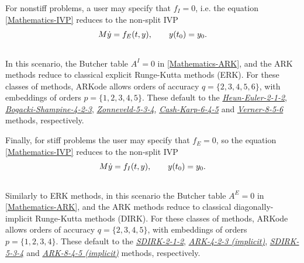 \documentclass[letterpaper,10pt,english]{sphinxmanual}
\begin{document}
For nonstiff problems, a user may specify that $f_I = 0$,
i.e. the equation \eqref{Mathematics-IVP} reduces to the non-split IVP
\label{Mathematics:equation-IVP_explicit}\begin{gather}
\begin{split}M\dot{y} = f_E(t,y), \qquad y(t_0) = y_0.\end{split}\label{Mathematics-IVP_explicit}\\\begin{split}\end{split}\notag
\end{gather}
In this scenario, the Butcher table $A^I=0$ in \eqref{Mathematics-ARK}, and
the ARK methods reduce to classical explicit Runge-Kutta
methods (ERK).  For these classes of methods, ARKode allows orders of
accuracy $q = \{2,3,4,5,6\}$, with embeddings of orders $p
= \{1,2,3,4,5\}$.  These default to the {\hyperref[Butcher:butcher-heun-euler]{\emph{Heun-Euler-2-1-2}}},
{\hyperref[Butcher:butcher-bogacki-shampine]{\emph{Bogacki-Shampine-4-2-3}}}, {\hyperref[Butcher:butcher-zonneveld]{\emph{Zonneveld-5-3-4}}},
{\hyperref[Butcher:butcher-cash-karp]{\emph{Cash-Karp-6-4-5}}} and {\hyperref[Butcher:butcher-verner-6-5]{\emph{Verner-8-5-6}}} methods,
respectively.

Finally, for stiff problems the user may specify that $f_E = 0$,
so the equation \eqref{Mathematics-IVP} reduces to the non-split IVP
\label{Mathematics:equation-IVP_implicit}\begin{gather}
\begin{split}M\dot{y} = f_I(t,y), \qquad y(t_0) = y_0.\end{split}\label{Mathematics-IVP_implicit}\\\begin{split}\end{split}\notag
\end{gather}
Similarly to ERK methods, in this scenario the Butcher table
$A^E=0$ in \eqref{Mathematics-ARK}, and the ARK methods reduce to classical
diagonally-implicit Runge-Kutta methods (DIRK).  For these
classes of methods, ARKode allows orders of accuracy $q =
\{2,3,4,5\}$, with embeddings of orders $p = \{1,2,3,4\}$.
These default to the {\hyperref[Butcher:butcher-sdirk-2-1]{\emph{SDIRK-2-1-2}}},
{\hyperref[Butcher:butcher-ark-4-2-3-i]{\emph{ARK-4-2-3 (implicit)}}}, {\hyperref[Butcher:butcher-sdirk-5-4]{\emph{SDIRK-5-3-4}}} and
{\hyperref[Butcher:butcher-ark-8-4-5-i]{\emph{ARK-8-4-5 (implicit)}}} methods, respectively.
\end{document}
